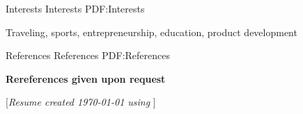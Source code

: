 \documentclass[letterpaper,MMMyyyy,nonstopmode]{simpleresumecv}
\newcommand{\CVNote}{Resume created {\today} using {\XeLaTeX}}
\begin{document}
\begin{Body}

\Section
{Interests}
{Interests}
{PDF:Interests}

\Entry
Traveling, sports, entrepreneurship, education, product development


\Section
{References}
{References}
{PDF:References}

\BulletItem
\textbf{Rereferences given upon request}

\end{Body}


\BigGap
\UseNoteFont%
\null\hfill%
[\textit{\CVNote}]
\end{document}
